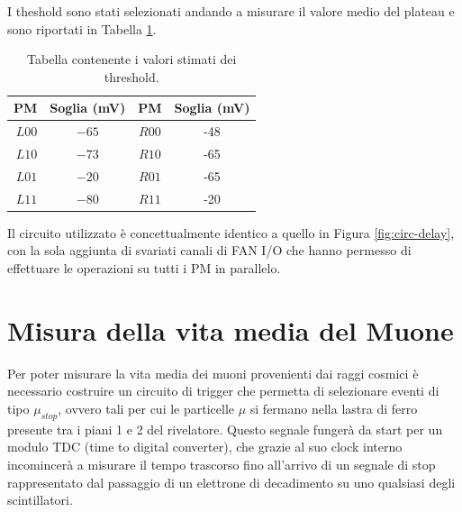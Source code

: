 \documentclass{standalone}
\begin{document}
	I theshold sono stati selezionati andando a misurare il valore medio del plateau e sono riportati in Tabella \ref{tab:discrimination}.
	\begin{table}[H]                        %
		\begin{center}                          %
			\begin{tabular}{r|c|c|c}                  %
				\hline \hline                           %
				PM & Soglia (mV) & PM & Soglia (mV) \\           %
				\hline                                  %
				$L00$ & $-65$ & $R00$ & -48 \\           %
				\hline                                  %
				$L10$ & $-73$ & $R10$ & -65 \\           %
				\hline
				$L01$ & $-20$ & $R01$ & -65 \\           %
				\hline
				$L11$ & $-80$ & $R11$ & -20 \\           %

				\hline \hline                           %
			\end{tabular}
      \caption{Tabella contenente i valori stimati dei threshold.}
			\label{tab:discrimination}
		\end{center}
	\end{table}

	Il circuito utilizzato \`e concettualmente identico a quello in Figura \ref{fig:circ-delay}, con la sola aggiunta di svariati canali di FAN I/O che hanno permesso di effettuare le operazioni su tutti i PM in parallelo.







	\chapter{Misura della vita media del Muone}
	Per poter misurare la vita media dei muoni provenienti dai raggi cosmici \`e necessario costruire un circuito di trigger che permetta di selezionare eventi di tipo $\mu_{stop}$, ovvero tali per cui le particelle $\mu$ si fermano nella lastra di ferro presente tra i piani 1 e 2 del rivelatore. Questo segnale funger\`a da start per un modulo TDC (time to digital converter), che grazie al suo clock interno incomincer\`a a misurare il tempo trascorso fino all'arrivo di un segnale di stop rappresentato dal passaggio di un elettrone di decadimento su uno qualsiasi degli scintillatori.
\end{document}
